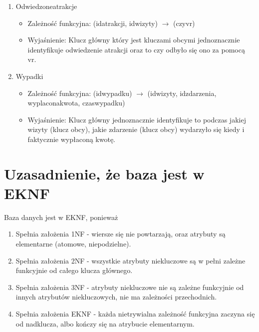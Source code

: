 \documentclass{article}
\begin{document}
\begin{enumerate}
\begin{itemize}
\end{itemize}
\item  Odwiedzone\textunderscore atrakcje
\begin{itemize}
    \item Zależność funkcyjna: \newline
    (id\textunderscore atrakcji, id\textunderscore wizyty) $\rightarrow$ (czy\textunderscore vr)
    \item Wyjaśnienie: \newline
    Klucz główny który jest kluczami obcymi jednoznacznie identyfikuje odwiedzenie atrakcji oraz to czy odbyło się ono za pomocą vr.
\end{itemize}
\item Wypadki 
\begin{itemize}
    \item Zależność funkcyjna: \newline
    (id\textunderscore wypadku) $\rightarrow$ (id\textunderscore wizyty, id\textunderscore zdarzenia, wyplacona\textunderscore kwota, czas\textunderscore wypadku)
    \item Wyjaśnienie: \newline
    Klucz główny jednoznacznie identyfikuje to podczas jakiej wizyty (klucz obcy), jakie zdarzenie (klucz obcy) wydarzyło się kiedy i faktycznie wypłaconą kwotę.
\end{itemize}
\end{enumerate}
\section{\LARGE Uzasadnienie, że baza jest w EKNF}
Baza danych jest w EKNF, ponieważ
\begin{enumerate}
    \item Spełnia założenia 1NF - wiersze się nie powtarzają, oraz atrybuty są elementarne (atomowe, niepodzielne).
    \item Spełnia założenia 2NF - wszystkie atrybuty niekluczowe są w pełni zależne funkcyjnie od całego klucza głównego.
    \item Spełnia założenia 3NF - atrybuty niekluczowe nie są zależne funkcyjnie od innych atrybutów niekluczowych, nie ma zależności przechodnich.
    \item Spełnia założenia EKNF - każda nietrywialna zależność funkcyjna zaczyna się od nadklucza, albo kończy się na atrybucie elementarnym.
\end{enumerate}
\end{document}
